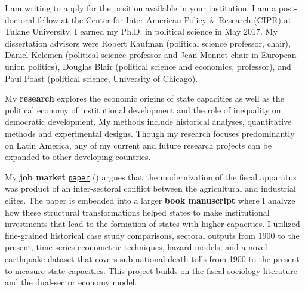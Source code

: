 \documentclass[10pt,stdletter,dateno,sigleft]{newlfm} %
\begin{document}
\begin{newlfm}


\vspace{-0.3cm}I am writing to apply for the position available in your institution. I am a post-doctoral fellow at the Center for Inter-American Policy \& Research (CIPR) at Tulane University. I earned my Ph.D. in political science in May 2017. My dissertation advisors were Robert Kaufman (political science professor, chair), Daniel Kelemen (political science professor and Jean Monnet chair in European union politics), Douglas Blair (political science and economics, professor), and Paul Poast (political science, University of Chicago).

My {\bf research} explores the economic origins of state capacities as well as the political economy of institutional development and the role of inequality on democratic development. My methods include historical analyses, quantitative methods and experimental designs. Though my research focuses predominantly on Latin America, any of my current and future research projects can be expanded to other developing countries. 


My {\bf job market} \href{https://github.com/hbahamonde/IncomeTaxAdoption/raw/master/Bahamonde_IncomeTaxAdoption.pdf}{\texttt{paper}} (\emph{\unskip}) argues that the modernization of the fiscal apparatus was product of an inter-sectoral conflict between the agricultural and industrial elites. The paper is embedded into a larger {\bf book manuscript} where I analyze how these structural transformations helped states to make institutional investments that lead to the formation of states with higher capacities. I utilized fine-grained historical case study comparisons, sectoral outputs from 1900 to the present, time-series econometric techniques, hazard models, and a novel earthquake dataset that covers sub-national death tolls from 1900 to the present to measure state capacities. This project builds on the fiscal sociology literature and the dual-sector economy model. 


\end{newlfm}
\end{document}

